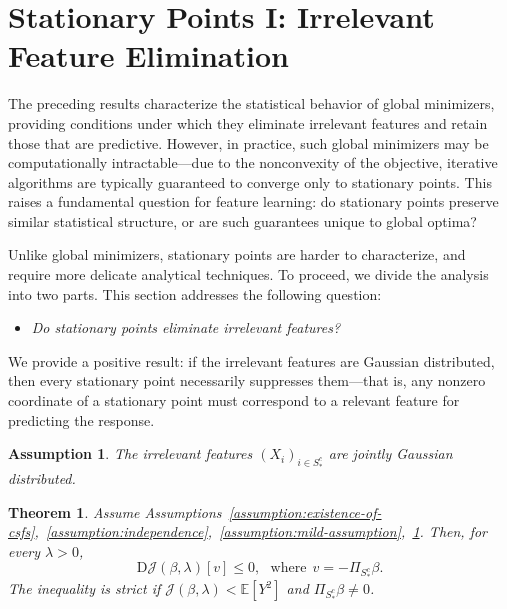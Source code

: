 \documentclass[sn-mathphys-num]{sn-jnl}%
\numberwithin{equation}{section}
\newcommand{\E}{\mathbb{E}}
\newtheorem{assumption}{Assumption}[section]
\theoremstyle{thmstyleone}%
\newtheorem{theorem}{Theorem}%
\theoremstyle{thmstyletwo}%
\theoremstyle{thmstylethree}%
\begin{document}
\section{Stationary Points I: Irrelevant Feature Elimination} 
\label{sec:stationary-points-and-irrelevant-feature-elimination} 
The preceding results characterize the statistical behavior of global minimizers, providing conditions under which they eliminate irrelevant features and retain those that are predictive. However, in practice, such global minimizers may be computationally intractable---due to the nonconvexity of the objective, iterative algorithms are typically guaranteed to converge only to stationary points. This raises a fundamental question for feature learning: do stationary points preserve similar statistical structure, or are such guarantees unique to global optima?

Unlike global minimizers, stationary points are harder to characterize, and require more delicate analytical techniques. To proceed, we divide the analysis into two parts. This section addresses the following question:

\vspace{.5em} 

\begin{itemize}
\item[($\mathsf{Q3}$)] \emph{Do stationary points eliminate irrelevant features?}
\end{itemize} 

\vspace{.5em} 

We provide a positive result: if the irrelevant features are Gaussian distributed, then every stationary point necessarily suppresses them---that is, any nonzero coordinate of a stationary point must correspond to a relevant feature for predicting the response.


\vspace{.5em}
\begin{assumption} 
\label{assumption:Gaussian-noise}
The irrelevant features $(X_i)_{i \in S_*^c}$ are jointly Gaussian distributed. %
\end{assumption} 

\vspace{.5em} 
\begin{theorem}
\label{theorem:Gaussian-noise} 
Assume Assumptions~\ref{assumption:existence-of-csfs},~\ref{assumption:independence},~\ref{assumption:mild-assumption},~\ref{assumption:Gaussian-noise}. Then, for every $\lambda > 0$, %
\begin{equation*}
	\mathrm{D}\mathcal{J}(\beta, \lambda)[v] \le 0,~~~\text{where}~~v = -\Pi_{S_*^c} \beta. 
\end{equation*}
The inequality is strict if $\mathcal{J}(\beta, \lambda) <  \E[Y^2]$ and $\Pi_{S_*^c} \beta \ne 0$.
\end{theorem} 
\end{document}
